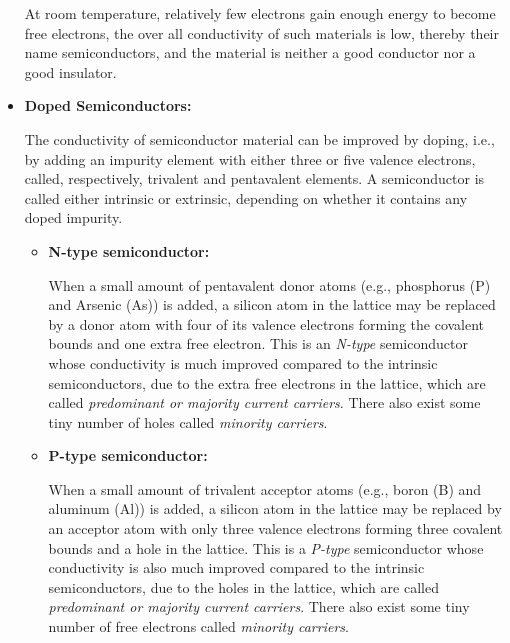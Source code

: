 \begin{itemize}
At room temperature, relatively few electrons gain enough energy to become
free electrons, the over all conductivity of such materials is low, thereby
their name semiconductors, and the material is neither a good conductor nor
a good insulator.


\item {\bf Doped Semiconductors:}

The conductivity of semiconductor material can be improved by doping, i.e.,
by adding an impurity element with either three or five valence electrons,
called, respectively, trivalent and pentavalent elements. A semiconductor
is called either intrinsic or extrinsic, depending on whether it contains
any doped impurity.



\begin{itemize}
\item {\bf N-type semiconductor:}

When a small amount of pentavalent donor atoms (e.g., phosphorus (P) and
Arsenic (As)) is added, a silicon atom in the lattice may be replaced by
a donor atom with four of its valence electrons forming the covalent bounds 
and one extra free electron. This is an {\em N-type} semiconductor whose 
conductivity is much improved compared to the intrinsic semiconductors, due 
to the extra free electrons in the lattice, which are called {\em predominant
or majority current carriers}. There also exist some tiny number of holes 
called {\em minority carriers}.

\item {\bf P-type semiconductor:}

When a small amount of trivalent acceptor atoms (e.g., boron (B) and aluminum
(Al)) is added, a silicon atom in the lattice may be replaced by an acceptor
atom with only three valence electrons forming three covalent bounds and a 
hole in the lattice. This is a {\em P-type} semiconductor whose conductivity 
is also much improved compared to the intrinsic semiconductors, due to the 
holes in the lattice, which are called {\em predominant or majority current 
carriers}. There also exist some tiny number of free electrons called 
{\em minority carriers}.
\end{itemize}



\end{itemize}
